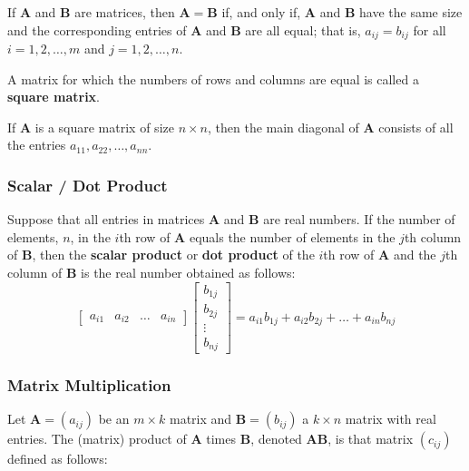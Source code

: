 \documentclass{article}
\theoremstyle{plain}
\theoremstyle{definition}
\theoremstyle{remark}
\begin{document}
If $\mathbf{A}$ and $\mathbf{B}$ are matrices, then $\mathbf{A} = \mathbf{B}$ if, and only if, $\mathbf{A}$ and $\mathbf{B}$ have the same size and the corresponding entries of $\mathbf{A}$ and $\mathbf{B}$ are all equal; that is, $a_{ij} = b_{ij}$ for all $i = 1,2,\dots,m$ and $j = 1,2,\dots,n$.
 
A matrix for which the numbers of rows and columns are equal is called a \textbf{square matrix}.
 
If $\mathbf{A}$ is a square matrix of size $n \times n$, then the main diagonal of $\mathbf{A}$ consists of all the entries $a_{11}, a_{22}, \dots, a_{nn}$.
 
\subsubsection*{Scalar / Dot Product}
Suppose that all entries in matrices $\mathbf{A}$ and $\mathbf{B}$ are real numbers. If the number of elements, $n$, in the $i$th row of $\mathbf{A}$ equals the number of elements in the $j$th column of $\mathbf{B}$, then the \textbf{scalar product} or \textbf{dot product} of the $i$th row of $\mathbf{A}$ and the $j$th column of $\mathbf{B}$ is the real number obtained as follows:
\[
\begin{bmatrix} a_{i1} & a_{i2} & \dots & a_{in} \end{bmatrix}
\begin{bmatrix} b_{1j} \\ b_{2j} \\ \vdots \\ b_{nj} \end{bmatrix}
= a_{i1}b_{1j} + a_{i2}b_{2j} + \dots + a_{in}b_{nj}
\]
 
\subsubsection*{Matrix Multiplication}
Let $\mathbf{A} = (a_{ij})$ be an $m \times k$ matrix and $\mathbf{B} = (b_{ij})$ a $k \times n$ matrix with real entries. The (matrix) product of $\mathbf{A}$ times $\mathbf{B}$, denoted $\mathbf{AB}$, is that matrix $(c_{ij})$ defined as follows:
 
\end{document}
